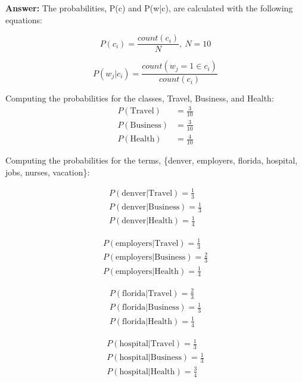 \documentclass[11pt]{article}
\begin{document}
\begin{enumerate}
        \textbf{Answer:} The probabilities, P(c) and P(w|c), are calculated with the following equations:

        \begin{equation*}
            P(c_i) = \frac{count(c_i)}{N}, \ N=10
        \end{equation*}

        \begin{equation*}
            P(w_j|c_i) = \frac{count(w_j=1 \in c_i)}{count(c_i)}
        \end{equation*}

        Computing the probabilities for the classes, Travel, Business, and Health:
        \begin{align*}
            P(\text{Travel}) &= \frac{3}{10} \\
            P(\text{Business}) &= \frac{3}{10} \\
            P(\text{Health}) &= \frac{4}{10}
        \end{align*}

        Computing the probabilities for the terms, \{denver, employers, florida, hospital, jobs, nurses, vacation\}:

        \begin{align*}
            P(\text{denver}|\text{Travel}) = \frac{1}{3} \\
            P(\text{denver}|\text{Business}) = \frac{1}{3} \\
            P(\text{denver}|\text{Health}) = \frac{1}{4}
        \end{align*}

        \begin{align*}
            P(\text{employers}|\text{Travel}) = \frac{1}{3} \\
            P(\text{employers}|\text{Business}) = \frac{2}{3} \\
            P(\text{employers}|\text{Health}) = \frac{1}{4}
        \end{align*}

        \begin{align*}
            P(\text{florida}|\text{Travel}) = \frac{2}{3} \\
            P(\text{florida}|\text{Business}) = \frac{1}{3} \\
            P(\text{florida}|\text{Health}) = \frac{1}{4}
        \end{align*}

        \begin{align*}
            P(\text{hospital}|\text{Travel}) = \frac{1}{3} \\
            P(\text{hospital}|\text{Business}) = \frac{1}{3} \\
            P(\text{hospital}|\text{Health}) = \frac{3}{4}
        \end{align*}


\end{enumerate}
\end{document}
